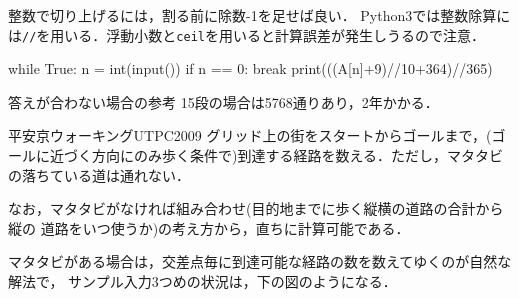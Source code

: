 整数で切り上げるには，割る前に除数-1を足せば良い．
Python3では整数除算には\texttt{//}を用いる．浮動小数と\texttt{ceil}を用いると計算誤差が発生しうるので注意．

\begin{pybox}
while True:
    n = int(input())
    if n == 0:
        break
    print(((A[n]+9)//10+364)//365)  
\end{pybox}


\begin{debugbox}{答えが合わない場合の参考}
   15段の場合は5768通りあり，2年かかる．
\end{debugbox}

\begin{pbox}{平安京ウォーキング}{UTPC2009}
  グリッド上の街をスタートからゴールまで，(ゴールに近づく方向にのみ歩く条件で)到達する経路を数える．ただし，マタタビの落ちている道は通れない．

\end{pbox}

なお，マタタビがなければ組み合わせ(目的地までに歩く縦横の道路の合計から縦の
道路をいつ使うか)の考え方から，直ちに計算可能である．

マタタビがある場合は，交差点毎に到達可能な経路の数を数えてゆくのが自然な解法で，
サンプル入力3つめの状況は，下の図のようになる．

